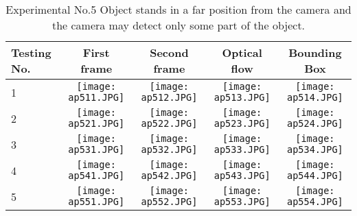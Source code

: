 \begin{table}[h]
	\begin{adjustwidth}{-1.2in}{-1.2in}%
		\begin{tabular}{|p{1.1cm}|c|c|c|c|}
			\hline
			Testing No. & First frame & Second frame & Optical flow & Bounding Box \\ \hline
			1 & 
			\texttt{[image: ap511.JPG]} & \texttt{[image: ap512.JPG]} & \texttt{[image: ap513.JPG]} & \texttt{[image: ap514.JPG]} \\
			2 & 
			\texttt{[image: ap521.JPG]} & \texttt{[image: ap522.JPG]} & \texttt{[image: ap523.JPG]} & \texttt{[image: ap524.JPG]} \\
			3 & 
			\texttt{[image: ap531.JPG]} & \texttt{[image: ap532.JPG]} & \texttt{[image: ap533.JPG]} & \texttt{[image: ap534.JPG]} \\
			4 & 
			\texttt{[image: ap541.JPG]} & \texttt{[image: ap542.JPG]} & \texttt{[image: ap543.JPG]} & \texttt{[image: ap544.JPG]} \\
			5 & 
			\texttt{[image: ap551.JPG]} & \texttt{[image: ap552.JPG]} & \texttt{[image: ap553.JPG]} & \texttt{[image: ap554.JPG]} \\
			\hline
		\end{tabular}
		\caption{Experimental No.5 Object stands in a far position from the camera and the camera may detect only some part of the object.}
		\label{tab:05}
	\end{adjustwidth}
\end{table}
